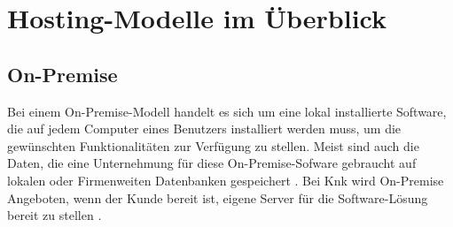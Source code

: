 \documentclass[12pt,bibtotoc]{article}
\begin{document}
	\section{Hosting-Modelle im Überblick}
		\subsection{On-Premise}
		Bei einem On-Premise-Modell handelt es sich um eine lokal installierte Software, die auf jedem Computer eines Benutzers installiert werden muss, um die gewünschten Funktionalitäten zur Verfügung zu stellen.
		Meist sind auch die Daten, die eine Unternehmung für diese On-Premise-Sofware gebraucht auf lokalen oder Firmenweiten Datenbanken gespeichert \cite{AlHayek.2020}. 
		Bei Knk wird On-Premise Angeboten, wenn der Kunde bereit ist, eigene Server für die Software-Lösung bereit zu stellen \cite{Anhang}.
\end{document}
